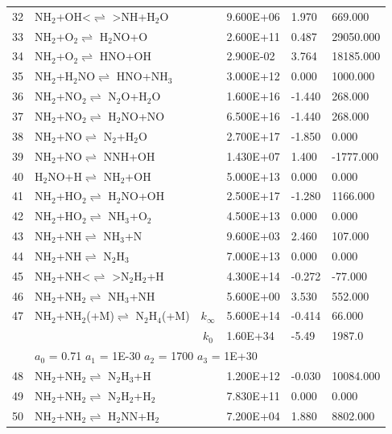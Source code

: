 \documentclass[11pt]{article}
\begin{document}
\begin{table}[hbt]
\begin{tabular}{|r l c l l l|}
32 &	NH$_{2}$+OH<$\rightleftharpoons$ >NH+H$_{2}$O&	&	9.600E+06&	1.970&	669.000\\ 
33 &	NH$_{2}$+O$_{2}$$\rightleftharpoons$ H$_{2}$NO+O&	&	2.600E+11&	0.487&	29050.000\\ 
34 &	NH$_{2}$+O$_{2}$$\rightleftharpoons$ HNO+OH&	&	2.900E-02&	3.764&	18185.000\\ 
35 &	NH$_{2}$+H$_{2}$NO$\rightleftharpoons$ HNO+NH$_{3}$&	&	3.000E+12&	0.000&	1000.000\\ 
36 &	NH$_{2}$+NO$_{2}$$\rightleftharpoons$ N$_{2}$O+H$_{2}$O&	&	1.600E+16&	-1.440&	268.000\\ 
37 &	NH$_{2}$+NO$_{2}$$\rightleftharpoons$ H$_{2}$NO+NO&	&	6.500E+16&	-1.440&	268.000\\ 
38 &	NH$_{2}$+NO$\rightleftharpoons$ N$_{2}$+H$_{2}$O&	&	2.700E+17&	-1.850&	0.000\\ 
39 &	NH$_{2}$+NO$\rightleftharpoons$ NNH+OH&	&	1.430E+07&	1.400&	-1777.000\\ 
40 &	H$_{2}$NO+H$\rightleftharpoons$ NH$_{2}$+OH&	&	5.000E+13&	0.000&	0.000\\ 
41 &	NH$_{2}$+HO$_{2}$$\rightleftharpoons$ H$_{2}$NO+OH&	&	2.500E+17&	-1.280&	1166.000\\ 
42 &	NH$_{2}$+HO$_{2}$$\rightleftharpoons$ NH$_{3}$+O$_{2}$&	&	4.500E+13&	0.000&	0.000\\ 
43 &	NH$_{2}$+NH$\rightleftharpoons$ NH$_{3}$+N&	&	9.600E+03&	2.460&	107.000\\ 
44 &	NH$_{2}$+NH$\rightleftharpoons$ N$_{2}$H$_{3}$&	&	7.000E+13&	0.000&	0.000\\ 
45 &	NH$_{2}$+NH<$\rightleftharpoons$ >N$_{2}$H$_{2}$+H&	&	4.300E+14&	-0.272&	-77.000\\ 
46 &	NH$_{2}$+NH$_{2}$$\rightleftharpoons$ NH$_{3}$+NH&	&	5.600E+00&	3.530&	552.000\\ 
47 &	NH$_{2}$+NH$_{2}$(+M)$\rightleftharpoons$ N$_{2}$H$_{4}$(+M)&	$k_{\infty}$&	5.600E+14&	-0.414&	66.000\\ 
	&	&	$k_0$&	1.60E+34&-5.49&	 1987.0\\ 
	&\multicolumn{5}{l|}{	$a_0$ = 0.71	$a_1$ = 1E-30	$a_2$ = 1700	$a_3$ = 1E+30}\\ 
48 &	NH$_{2}$+NH$_{2}$$\rightleftharpoons$ N$_{2}$H$_{3}$+H&	&	1.200E+12&	-0.030&	10084.000\\ 
49 &	NH$_{2}$+NH$_{2}$$\rightleftharpoons$ N$_{2}$H$_{2}$+H$_{2}$&	&	7.830E+11&	0.000&	0.000\\ 
50 &	NH$_{2}$+NH$_{2}$$\rightleftharpoons$ H$_{2}$NN+H$_{2}$&	&	7.200E+04&	1.880&	8802.000\\ 

\end{tabular}
\end{table}
\end{document}
